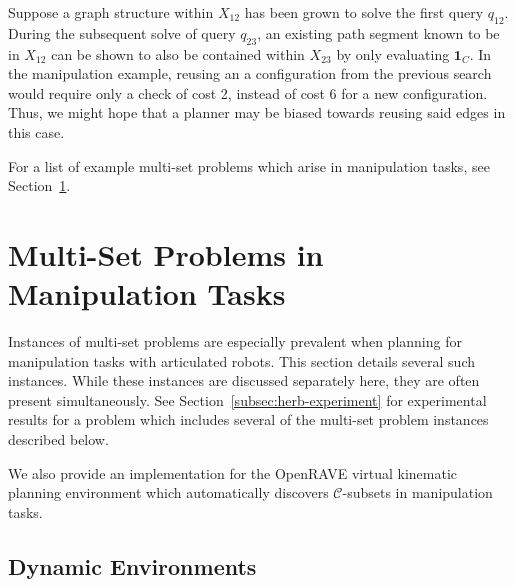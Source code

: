 Suppose a graph structure within ${X_{12}}$ has been grown to solve
the first query $q_{12}$.
During the subsequent solve of query $q_{23}$,
an existing path segment known to be in ${X_{12}}$ can be shown to
also be contained within ${X_{23}}$ by only evaluating $\mathbf{1}_C$.
In the manipulation example,
reusing an a configuration from the previous search
would require only a check of cost 2,
instead of cost 6 for a new configuration.
Thus, we might hope that a planner may be biased towards reusing
said edges in this case.

For a list of example multi-set problems which arise in manipulation
tasks,
see Section~\ref{sec:in-manipulation}.

\section{Multi-Set Problems in Manipulation Tasks}
\label{sec:in-manipulation}

Instances of multi-set problems are especially prevalent when
planning for manipulation tasks with articulated robots.
This section details several such instances.
While these instances are discussed separately here,
they are often present simultaneously.
See Section~\ref{subsec:herb-experiment}
for experimental results for a problem
which includes several of the multi-set problem instances
described below.

We also provide an implementation for the
OpenRAVE\cite{diankov2010openrave}
virtual kinematic planning environment
which automatically discovers $\mathcal{C}$-subsets
in manipulation tasks.

\subsection{Dynamic Environments}
\label{subsec:dynamic-environments}

